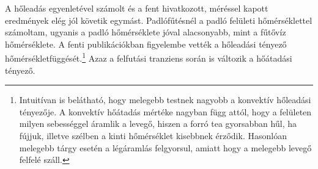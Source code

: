 A hőleadás egyenletével számolt és a fent hivatkozott, méréssel kapott eredmények elég jól követik egymást. Padlófűtésnél a padló felületi hőmérséklettel számoltam, ugyanis a padló hőmérséklete jóval alacsonyabb, mint a fűtővíz hőmérséklete.
A fenti publikációkban figyelembe vették a hőleadási tényező hőmérsékletfüggését.\footnote{Intuitívan is belátható, hogy melegebb testnek nagyobb a konvektív hőleadási tényezője. A konvektív hőátadás mértéke nagyban függ attól, hogy a felületen milyen sebességgel áramlik a levegő, hiszen a forró tea gyorsabban hűl, ha fújjuk, illetve szélben a kinti hőmérséklet kisebbnek érződik. Hasonlóan melegebb tárgy esetén a légáramlás felgyorsul, amiatt hogy a melegebb levegő felfelé száll.} %
Azaz a felfutási tranziens során is változik a hőátadási tényező.



\pagebreak